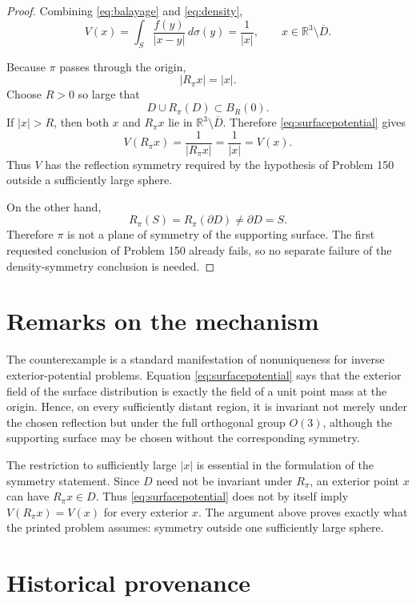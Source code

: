 \documentclass[11pt]{article}
\begin{document}
\begin{proof}
Combining \eqref{eq:balayage} and \eqref{eq:density},
\begin{equation}\label{eq:surfacepotential}
  V(x)
  =\int_S \frac{f(y)}{|x-y|}\,d\sigma(y)
  =\frac{1}{|x|},
  \qquad x\in\mathbb R^3\setminus\overline D.
\end{equation}

Because $\pi$ passes through the origin,
\[
  |R_\pi x|=|x|.
\]
Choose $R>0$ so large that
\[
  D\cup R_\pi(D)\subset B_R(0).
\]
If $|x|>R$, then both $x$ and $R_\pi x$ lie in $\mathbb R^3\setminus\overline D$. Therefore \eqref{eq:surfacepotential} gives
\[
  V(R_\pi x)
  =\frac{1}{|R_\pi x|}
  =\frac{1}{|x|}
  =V(x).
\]
Thus $V$ has the reflection symmetry required by the hypothesis of Problem 150 outside a sufficiently large sphere.

On the other hand,
\[
  R_\pi(S)=R_\pi(\partial D)\neq\partial D=S.
\]
Therefore $\pi$ is not a plane of symmetry of the supporting surface. The first requested conclusion of Problem 150 already fails, so no separate failure of the density-symmetry conclusion is needed.
\end{proof}

\section{Remarks on the mechanism}

The counterexample is a standard manifestation of nonuniqueness for inverse exterior-potential problems. Equation \eqref{eq:surfacepotential} says that the exterior field of the surface distribution is exactly the field of a unit point mass at the origin. Hence, on every sufficiently distant region, it is invariant not merely under the chosen reflection but under the full orthogonal group $O(3)$, although the supporting surface may be chosen without the corresponding symmetry.

The restriction to sufficiently large $|x|$ is essential in the formulation of the symmetry statement. Since $D$ need not be invariant under $R_\pi$, an exterior point $x$ can have $R_\pi x\in D$. Thus \eqref{eq:surfacepotential} does not by itself imply $V(R_\pi x)=V(x)$ for every exterior $x$. The argument above proves exactly what the printed problem assumes: symmetry outside one sufficiently large sphere.

\section{Historical provenance}
\end{document}
